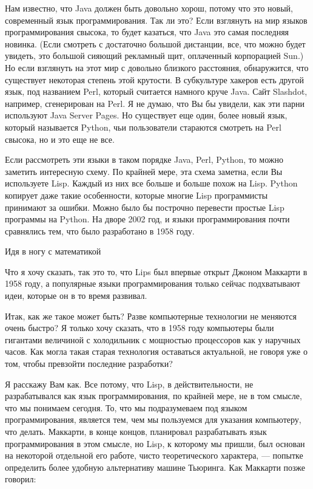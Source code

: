 \documentclass[ebook,12pt,oneside,openany]{memoir}
\begin{document}
Нам известно, что Java должен быть довольно хорош, потому что это
новый, современный язык программирования. Так ли это? Если взглянуть
на мир языков программирования свысока, то будет казаться, что Java
это самая последняя новинка. (Если смотреть с достаточно большой
дистанции, все, что можно будет увидеть, это большой сияющий рекламный
щит, оплаченный корпорацией Sun.) Но если взглянуть на этот мир с
довольно близкого расстояния, обнаружится, что существует некоторая
степень этой крутости. В субкультуре хакеров есть другой язык, под
названием Perl, который считается намного круче Java. Сайт Slashdot,
например, сгенерирован на Perl. Я не думаю, что Вы бы увидели, как эти
парни используют Java Server Pages. Но существует еще один, более
новый язык, который называется Python, чьи пользователи стараются
смотреть на Perl свысока, но и это еще не все.

Если рассмотреть эти языки в таком порядке Java, Perl, Python, то
можно заметить интересную схему. По крайней мере, эта схема заметна,
если Вы используете Lisp. Каждый из них все больше и больше похож на
Lisp. Python копирует даже такие особенности, которые многие Lisp
программисты принимают за ошибки. Можно было бы построчно перевести
простые Lisp программы на Python. На дворе 2002 год, и языки
программирования почти сравнялись тем, что было разработано в 1958
году.

Идя в ногу с математикой

Что я хочу сказать, так это то, что Lips был впервые открыт Джоном
Маккарти в 1958 году, а популярные языки программирования только
сейчас подхватывают идеи, которые он в то время развивал.

Итак, как же такое может быть? Разве компьютерные технологии не
меняются очень быстро? Я только хочу сказать, что в 1958 году
компьютеры были гигантами величиной с холодильник с мощностью
процессоров как у наручных часов. Как могла такая старая технология
оставаться актуальной, не говоря уже о том, чтобы превзойти последние
разработки?

Я расскажу Вам как. Все потому, что Lisp, в действительности, не
разрабатывался как язык программирования, по крайней мере, не в том
смысле, что мы понимаем сегодня. То, что мы подразумеваем под языком
программирования, является тем, чем мы пользуемся для указания
компьютеру, что делать. Маккарти, в конце концов, планировал
разрабатывать язык программирования в этом смысле, но Lisp, к которому
мы пришли, был основан на некоторой отдельной его работе, чисто
теоретического характера, — попытке определить более удобную
альтернативу машине Тьюринга. Как Маккарти позже говорил:
\end{document}
